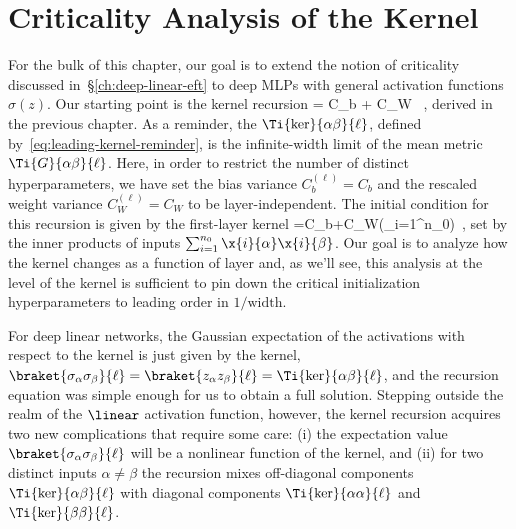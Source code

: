 \section{Criticality Analysis of the Kernel}\label{sec:bootstrapping}
For the bulk of this chapter, our goal is to extend the notion of criticality discussed in~\S\ref{ch:deep-linear-eft} to deep MLPs with general activation functions $\sigma(z)$. Our starting point is the kernel recursion
\be\label{eq:kernel-recursion-reminder}
 = C_b + C_W \braket{\sigma_{\alpha}\sigma_{\beta}}{\ell} \, ,
\ee
derived in the previous chapter. %
As a reminder,
the  $\Ti{\ker}{\alpha\beta}{\ell}$, defined by~\eqref{eq:leading-kernel-reminder}, is the infinite-width limit of the mean metric $\Ti{G}{\alpha\beta}{\ell}$. Here, in order to restrict the number of distinct hyperparameters, we have set the bias variance $C_b^{(\ell)}=C_b$ and the rescaled weight variance $C_W^{(\ell)}=C_W$ to be layer-independent.
The initial condition for this recursion is given by the first-layer kernel %
\be\label{eq:kernel-initial-condition}
=C_b+C_W\!\le(\sum_{i=1}^{n_0}\ri)\, ,
\ee 
set by the inner products of inputs $\sum_{i=1}^{n_0} \x{i}{\alpha}\x{i}{\beta}$. Our goal is to analyze how the kernel changes as a function of layer and, as we'll see, this analysis at the level of the kernel is sufficient to pin down the critical initialization hyperparameters to leading order in $1/\text{width}$.


For deep linear networks, the Gaussian expectation of the activations  with respect to the kernel is just given by the kernel, $\braket{\sigma_{\alpha}\sigma_{\beta}}{\ell}=\braket{z_{\alpha}z_{\beta}}{\ell}=\Ti{\ker}{\alpha\beta}{\ell}$, and the recursion equation was simple enough for us to obtain a full solution. Stepping outside the realm of the $\linear$ activation function, however, the kernel recursion acquires two new complications that require some care: (i) the expectation value $\braket{\sigma_{\alpha}\sigma_{\beta}}{\ell}$ will be a nonlinear function of the kernel, and (ii) for two distinct inputs $\alpha\ne\beta$ the recursion mixes off-diagonal components $\Ti{\ker}{\alpha\beta}{\ell}$ with diagonal components $\Ti{\ker}{\alpha\alpha}{\ell}$ and $\Ti{\ker}{\beta\beta}{\ell}$.


